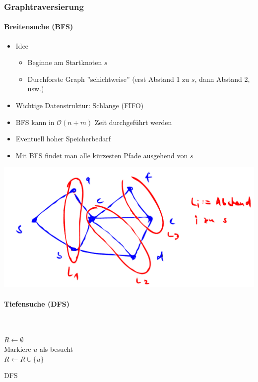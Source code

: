 \documentclass{scrartcl}
\begin{document}
\subsubsection{Graphtraversierung}

\paragraph{Breitensuche (BFS)}

\begin{itemize}
	\item Idee
	\begin{itemize}
		\item Beginne am Startknoten $ s $
		\item Durchforste Graph ''schichtweise'' (erst Abstand 1 zu $ s $, dann Abstand 2, usw.)
	\end{itemize}
	\item Wichtige Datenstruktur: Schlange (FIFO)
	\item BFS kann in $ \mathcal{O}(n+m) $ Zeit durchgeführt werden
	\item Eventuell hoher Speicherbedarf
	\item Mit BFS findet man alle kürzesten Pfade ausgehend von $ s $
\end{itemize}

\includegraphics[width=\linewidth]{figures/bfs.pdf}

\paragraph{Tiefensuche (DFS)}\mbox{} \\
\begin{algorithm}[H]
	$ R \leftarrow \emptyset $ \\
	Markiere $ u $ als besucht \\
	$ R \leftarrow R \cup \{ u \} $ \\
	\caption{DFS}
\end{algorithm}
\end{document}
